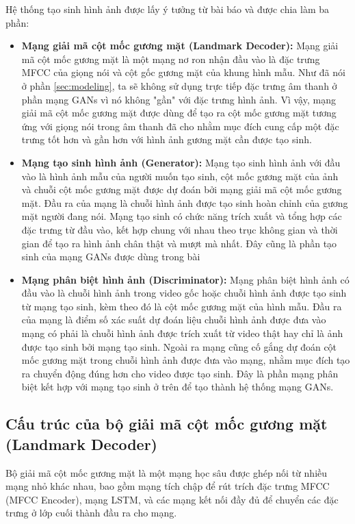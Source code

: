 Hệ thống tạo sinh hình ảnh được lấy ý tưởng từ bài báo \cite{chen2019} và được chia làm ba phần:
\begin{itemize}
    \item \textbf{Mạng giải mã cột mốc gương mặt (Landmark Decoder):} Mạng giải mã cột mốc gương mặt là một mạng nơ ron nhận đầu vào là đặc trưng MFCC của giọng nói và cột gốc gương mặt của khung hình mẫu. Như đã nói ở phần \ref{sec:modeling}, ta sẽ không sử dụng trực tiếp đặc trưng âm thanh ở phần mạng GANs vì nó không "gần" với đặc trưng hình ảnh. Vì vậy, mạng giải mã cột mốc gương mặt được dùng để tạo ra cột mốc gương mặt tương ứng với giọng nói trong âm thanh đã cho nhằm mục đích cung cấp một đặc trưng tốt hơn và gần hơn với hình ảnh gương mặt cần được tạo sinh.
    \item \textbf{Mạng tạo sinh hình ảnh (Generator):} Mạng tạo sinh hình ảnh với đầu vào là hình ảnh mẫu của người muốn tạo sinh, cột mốc gương mặt của ảnh và chuỗi cột mốc gương mặt được dự đoán bởi mạng giải mã cột mốc gương mặt. Đầu ra của mạng là chuỗi hình ảnh được tạo sinh hoàn chỉnh của gương mặt người đang nói. Mạng tạo sinh có chức năng trích xuất và tổng hợp các đặc trưng từ đầu vào, kết hợp chung với nhau theo trục không gian và thời gian để tạo ra hình ảnh chân thật và mượt mà nhất. Đây cũng là phần tạo sinh của mạng GANs được dùng trong bài
    \item \textbf{Mạng phân biệt hình ảnh (Discriminator):} Mạng phân biệt hình ảnh có đầu vào là chuỗi hình ảnh trong video gốc hoặc chuỗi hình ảnh được tạo sinh từ mạng tạo sinh, kèm theo đó là cột mốc gương mặt của hình mẫu. Đầu ra của mạng là điểm số xác suất dự đoán liệu chuỗi hình ảnh được đưa vào mạng có phải là chuỗi hình ảnh được trích xuất từ video thật hay chỉ là ảnh được tạo sinh bởi mạng tạo sinh. Ngoài ra mạng cũng cố gắng dự đoán cột mốc gương mặt trong chuỗi hình ảnh được đưa vào mạng, nhằm mục đích tạo ra chuyển động đúng hơn cho video được tạo sinh. Đây là phần mạng phân biệt kết hợp với mạng tạo sinh ở trên để tạo thành hệ thống mạng GANs.
\end{itemize}

\subsection{Cấu trúc của bộ giải mã cột mốc gương mặt (Landmark Decoder)}

Bộ giải mã cột mốc gương mặt là một mạng học sâu được ghép nối từ nhiều mạng nhỏ khác nhau, bao gồm mạng tích chập để rút trích đặc trưng MFCC (MFCC Encoder), mạng LSTM, và các mạng kết nối đầy đủ để chuyển các đặc trưng ở lớp cuối thành đầu ra cho mạng.

